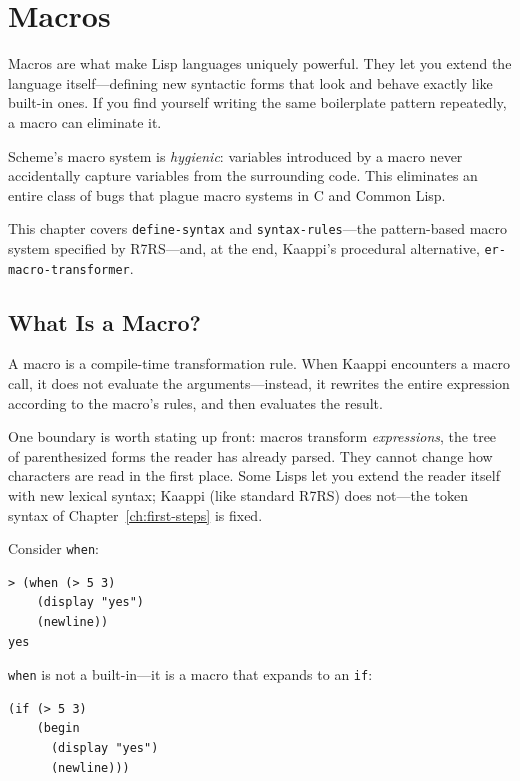 \chapter{Macros}
\label{ch:macros}

Macros are what make Lisp languages uniquely powerful. They let you extend the language itself---defining new syntactic forms that look and behave exactly like built-in ones. If you find yourself writing the same boilerplate pattern repeatedly, a macro can eliminate it.

Scheme's macro system is \emph{hygienic}: variables introduced by a macro never accidentally capture variables from the surrounding code. This eliminates an entire class of bugs that plague macro systems in C and Common Lisp.

This chapter covers \texttt{define-syntax} and \texttt{syntax-rules}---the pattern-based macro system specified by R7RS---and, at the end, Kaappi's procedural alternative, \texttt{er-macro-transformer}.

\section{What Is a Macro?}

A macro is a compile-time transformation rule. When Kaappi encounters a macro call, it does not evaluate the arguments---instead, it rewrites the entire expression according to the macro's rules, and then evaluates the result.

One boundary is worth stating up front: macros transform \emph{expressions}, the tree of parenthesized forms the reader has already parsed. They cannot change how characters are read in the first place. Some Lisps let you extend the reader itself with new lexical syntax; Kaappi (like standard R7RS) does not---the token syntax of Chapter~\ref{ch:first-steps} is fixed.

Consider \texttt{when}:

\begin{lstlisting}[style=repl]
> (when (> 5 3)
    (display "yes")
    (newline))
yes
\end{lstlisting}

\texttt{when} is not a built-in---it is a macro that expands to an \texttt{if}:

\begin{lstlisting}
(if (> 5 3)
    (begin
      (display "yes")
      (newline)))
\end{lstlisting}

